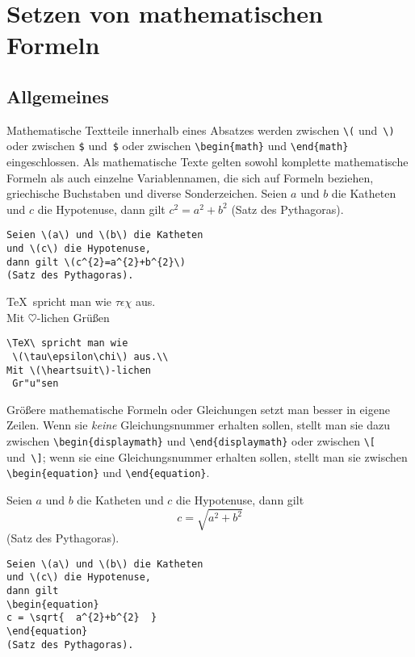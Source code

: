 
\section{Setzen von mathematischen Formeln} \label{math}
 
\subsection{Allgemeines}
 
Mathematische Textteile innerhalb eines Absatzes werden zwischen
\verb|\(| und~\verb|\)| oder zwischen \verb|$| und~\verb|$| oder
zwischen \verb|\begin{math}| und \verb|\end{math}|
eingeschlossen.
Als mathematische Texte gelten sowohl komplette mathematische
Formeln als auch einzelne Variablennamen, die sich auf Formeln
beziehen, griechische Buchstaben und diverse Sonderzeichen.
\exa
Seien \(a\) und \(b\) die Katheten
und \(c\) die Hypotenuse,
dann gilt \(c^{2}=a^{2}+b^{2}\)
(Satz des Pythagoras).
\exb
\begin{verbatim}
Seien \(a\) und \(b\) die Katheten
und \(c\) die Hypotenuse,
dann gilt \(c^{2}=a^{2}+b^{2}\)
(Satz des Pythagoras).
\end{verbatim}
\exc
\exa
\TeX\ spricht man wie
 \(\tau\epsilon\chi\) aus.\\[6pt]
Mit \(\heartsuit\)-lichen
 Grüßen
\exb
\begin{verbatim}
\TeX\ spricht man wie
 \(\tau\epsilon\chi\) aus.\\
Mit \(\heartsuit\)-lichen
 Gr"u"sen
\end{verbatim}
\exc
 
Größere mathematische Formeln oder Gleichungen setzt man besser
in eigene Zeilen. Wenn sie \emph{keine} Gleichungsnummer erhalten 
sollen, stellt man sie dazu zwischen \verb|\begin{displaymath}| und
\verb|\end{displaymath}| oder zwischen \verb|\[| und~\verb|\]|; 
wenn sie eine Gleichungsnummer erhalten sollen, stellt man sie
zwischen \verb|\begin{equation}| und \verb|\end{equation}|.

\exa
Seien \(a\) und \(b\) die Katheten
und \(c\) die Hypotenuse,
dann gilt
\begin{equation}
c = \sqrt{  a^{2}+b^{2}  }
\end{equation}
(Satz des Pythagoras).
\exb
\begin{verbatim}
Seien \(a\) und \(b\) die Katheten
und \(c\) die Hypotenuse,
dann gilt
\begin{equation}
c = \sqrt{  a^{2}+b^{2}  }
\end{equation}
(Satz des Pythagoras).
\end{verbatim}
\exc

